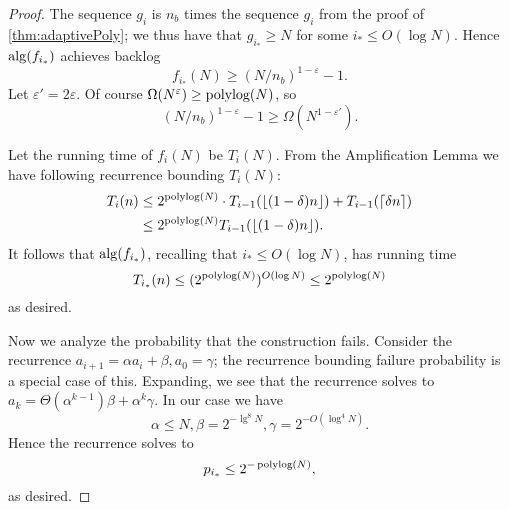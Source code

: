\begin{proof}
  The sequence $g_i$ is $n_b$ times the sequence $g_i$ from
  the proof of \cref{thm:adaptivePoly}; we thus have that $g_{i_*}
  \ge N$ for some $i_* \le O(\log N)$.
  Hence $\operatorname{\text{\textup{alg}}}(f_{i_*})$ achieves backlog 
  $$f_{i_*}(N) \ge (N/n_b)^{1-\varepsilon}-1.$$
  Let $\varepsilon' = 2\varepsilon$. Of course $\Omega(N^\varepsilon)
  \ge \operatorname{\text{polylog}}(N)$, so $$(N/n_b)^{1-\varepsilon}-1 \ge
  \Omega(N^{1-\varepsilon'}).$$

  Let the running time of $f_i(N)$ be $T_i(N)$. From the
  Amplification Lemma we have following recurrence bounding $T_i(N)$:
  \begin{align*}
    T_i(n) &\le 2^{\operatorname{\text{polylog}}(N)} \cdot T_{i-1}(\left\lfloor (1-\delta)n \right\rfloor) + T_{i-1}(\left\lceil \delta n \right\rceil) \\
            &\le 2^{\operatorname{\text{polylog}}(N)}T_{i-1}(\left\lfloor (1-\delta)n \right\rfloor).
  \end{align*}
  It follows that $\operatorname{\text{\textup{alg}}}(f_{i_*})$, recalling that $i_* \le O(\log N)$, has running time
  $$T_{i_*}(n) \le (2^{\operatorname{\text{polylog}}(N)})^{O(\log N)} \le 2^{\operatorname{\text{polylog}}(N)}$$
  as desired.

  Now we analyze the probability that the construction fails. 
  Consider the recurrence $a_{i+1} = \alpha a_i + \beta, a_0 =
  \gamma$; the recurrence bounding failure probability is a
  special case of this. Expanding, we see that the recurrence
  solves to $a_k = \Theta(\alpha^{k-1})\beta + \alpha^k \gamma$.
  In our case we have 
  $$\alpha \le N, \beta = 2^{-\lg^8 N}, \gamma = 2^{-O(\log^4 N)}.$$
  Hence the recurrence solves to 
  $$p_{i_*} \le 2^{-\operatorname{\text{polylog}}(N)},$$
  as desired.

\end{proof}

